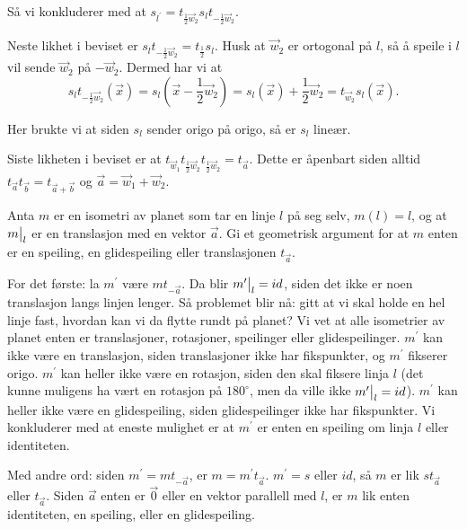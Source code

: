 \documentclass[11pt, norsk]{article}
\begin{document}
\begin{losn}
Så vi konkluderer med at $s_{l^\prime} = t_{\frac 12 \vec w_2}s_lt_{-\frac 12 \vec w_2}$.

Neste likhet i beviset er $s_l t_{-\frac 12 \vec w_2} = t_{\frac 12} s_l$. Husk at $\vec w_2$ er ortogonal på $l$, så å speile i $l$ vil sende $\vec w_2$ på $-\vec w_2$. Dermed har vi at
$$ s_l t_{-\frac 12 \vec w_2}(\vec x) = s_l(\vec x - \frac 12 \vec w_2) = s_l(\vec x) + \frac 12 \vec w_2 = t_{\vec w_2}s_l(\vec x).$$

Her brukte vi at siden $s_l$ sender origo på origo, så er $s_l$ lineær.

Siste likheten i beviset er at $t_{\vec w_1}t_{\frac 12\vec w_2}t_{\frac 12 \vec w_2} = t_{\vec a}$. Dette er åpenbart siden alltid $t_{\vec a}t_{\vec b}=t_{\vec a + \vec b}$ og $\vec a = \vec w_1 + \vec w_2$. 
\end{losn}

\begin{oppg}
 Anta $m$ er en isometri av planet som tar en linje $l$ på seg selv, $m(l)=l$, og at $\restr{m}{l}$ er en translasjon med en vektor $\vec a$. Gi et geometrisk argument for at $m$ enten er en speiling, en glidespeiling eller translasjonen $t_{\vec a}$.
\end{oppg}

\begin{losn}
For det første: la $m^\prime$ være $mt_{-\vec a}$. Da blir $\restr{m^\prime}{l}=id$, siden det ikke er noen translasjon langs linjen lenger. Så problemet blir nå: gitt at vi skal holde en hel linje fast, hvordan kan vi da flytte rundt på planet? Vi vet at alle isometrier av planet enten er translasjoner, rotasjoner, speilinger eller glidespeilinger. $m^\prime$ kan ikke være en translasjon, siden translasjoner ikke har fikspunkter, og $m^\prime$ fikserer origo. $m^\prime$ kan heller ikke være en rotasjon, siden den skal fiksere linja $l$ (det kunne muligens ha vært en rotasjon på $180^\circ$, men da ville ikke $\restr{m^\prime}l = id$). $m^\prime$ kan heller ikke være en glidespeiling, siden glidespeilinger ikke har fikspunkter. Vi konkluderer med at eneste mulighet er at $m^\prime$ er enten en speiling om linja $l$ eller identiteten. 

Med andre ord: siden $m^\prime= mt_{-\vec a}$, er $m = m^\prime t_{\vec a}$. $m^\prime=s$ eller $id$, så $m$ er lik $st_{\vec a}$ eller $t_{\vec a}$. Siden $\vec a$ enten er $\vec 0$ eller en vektor parallell med $l$, er $m$ lik enten identiteten, en speiling, eller en glidespeiling.
\end{losn}
\end{document}
